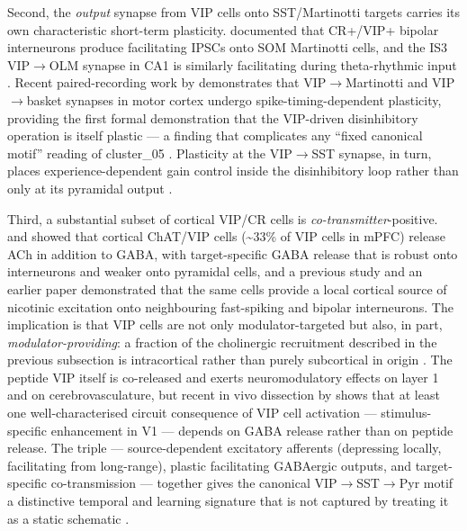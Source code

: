\documentclass[11pt]{article}
\let\origrightarrow\rightarrow
\def\rightarrow{\ensuremath{\origrightarrow}}
\begin{document}
Second, the \textit{output} synapse from VIP cells onto SST/Martinotti targets carries its own characteristic short-term plasticity. \citet{Cauli2014} documented that CR+/VIP+ bipolar interneurons produce facilitating IPSCs onto SOM Martinotti cells, and the IS3 VIP\rightarrow OLM synapse in CA1 is similarly facilitating during theta-rhythmic input \citep{Tyan2014, Francavilla2018a, Turi2019}. Recent paired-recording work by \citet{Mcfarlan2024a} demonstrates that VIP\rightarrow Martinotti and VIP\rightarrow basket synapses in motor cortex undergo spike-timing-dependent plasticity, providing the first formal demonstration that the VIP-driven disinhibitory operation is itself plastic --- a finding that complicates any ``fixed canonical motif'' reading of cluster\_05 \citep{Mcfarlan2024a, Mcfarlan2024b}. Plasticity at the VIP\rightarrow SST synapse, in turn, places experience-dependent gain control inside the disinhibitory loop rather than only at its pyramidal output \citep{Mcfarlan2024a, Karnani2016a, Wiera2024, Sabri2024}.

Third, a substantial subset of cortical VIP/CR cells is \textit{co-transmitter}-positive. \citet{Granger2020} and \citet{Obermayer2019} showed that cortical ChAT/VIP cells ({\textasciitilde}33\% of VIP cells in mPFC) release ACh in addition to GABA, with target-specific GABA release that is robust onto interneurons and weaker onto pyramidal cells, and a previous study and an earlier paper demonstrated that the same cells provide a local cortical source of nicotinic excitation onto neighbouring fast-spiking and bipolar interneurons. The implication is that VIP cells are not only modulator-targeted but also, in part, \textit{modulator-providing}: a fraction of the cholinergic recruitment described in the previous subsection is intracortical rather than purely subcortical in origin \citep{Granger2020, Obermayer2019, Vonengelhardt2007, Dudai2020, Letzkus2011}. The peptide VIP itself is co-released and exerts neuromodulatory effects on layer 1 and on cerebrovasculature, but recent in vivo dissection by \citet{Kaneko2024} shows that at least one well-characterised circuit consequence of VIP cell activation --- stimulus-specific enhancement in V1 --- depends on GABA release rather than on peptide release. The triple --- source-dependent excitatory afferents (depressing locally, facilitating from long-range), plastic facilitating GABAergic outputs, and target-specific co-transmission --- together gives the canonical VIP\rightarrow SST\rightarrow Pyr motif a distinctive temporal and learning signature that is not captured by treating it as a static schematic \citep{Karnani2016a, Cauli2014, Mcfarlan2024a, Granger2020, Kaneko2024, Walker2016, Pronneke2015}.
\end{document}
